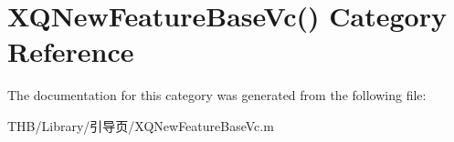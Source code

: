 \hypertarget{category_x_q_new_feature_base_vc_07_08}{}\section{X\+Q\+New\+Feature\+Base\+Vc() Category Reference}
\label{category_x_q_new_feature_base_vc_07_08}


The documentation for this category was generated from the following file\+:\begin{DoxyCompactItemize}
\item 
T\+H\+B/\+Library/引导页/X\+Q\+New\+Feature\+Base\+Vc.\+m\end{DoxyCompactItemize}
